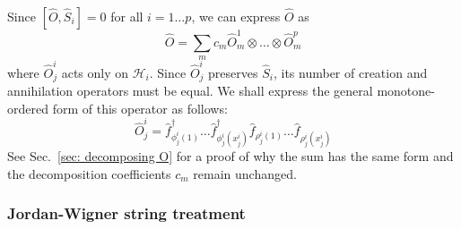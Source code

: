 \documentclass[12pt]{article}
\newcommand{\hc}{^\dagger}
\begin{document}
	Since $[\hat{O}, \hat{S}_i]=0$ for all $i = 1\dots p$, we can express $\hat{O}$ as
	\begin{equation} \label{eq: O separable form}
	\hat{O} = \sum_{m} c_m \hat{O}_m^1 \otimes \dots \otimes \hat{O}_m^p
	\end{equation}
	where $\hat{O}^i_j$ acts only on $\mathcal{H}_i$. Since $\hat{O}^i_j$ preserves $\hat{S}_i$, its number of creation and annihilation operators must be equal. We shall express the general monotone-ordered form of this operator as follows:
	\begin{equation}
	\hat{O}^i_j = \hat{f}_{\phi^i_j(1)}\hc \dots \hat{f}_{\phi^i_j(x^i_j)}\hc \hat{f}_{\rho^i_j(1)} \dots \hat{f}_{\rho^i_j(x^i_j)}
	\end{equation}
	See Sec.~\ref{sec: decomposing O} for a proof of why the sum has the same form and the decomposition coefficients $c_m$ remain unchanged.
	
	\subsubsection{Jordan-Wigner string treatment}
	
\end{document}
